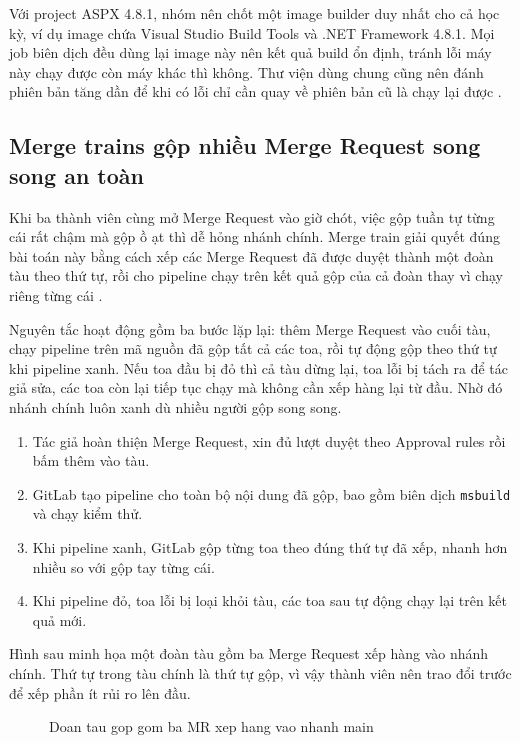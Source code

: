 Với project ASPX 4.8.1, nhóm nên chốt một image builder duy nhất cho cả học kỳ, ví dụ image chứa Visual Studio Build Tools và .NET Framework 4.8.1. Mọi job biên dịch đều dùng lại image này nên kết quả build ổn định, tránh lỗi máy này chạy được còn máy khác thì không. Thư viện dùng chung cũng nên đánh phiên bản tăng dần để khi có lỗi chỉ cần quay về phiên bản cũ là chạy lại được \cite{convcommits}.

\subsection{Merge trains gộp nhiều Merge Request song song an toàn}

Khi ba thành viên cùng mở Merge Request vào giờ chót, việc gộp tuần tự từng cái rất chậm mà gộp ồ ạt thì dễ hỏng nhánh chính. Merge train giải quyết đúng bài toán này bằng cách xếp các Merge Request đã được duyệt thành một đoàn tàu theo thứ tự, rồi cho pipeline chạy trên kết quả gộp của cả đoàn thay vì chạy riêng từng cái \cite{gitlabdocs}.

Nguyên tắc hoạt động gồm ba bước lặp lại: thêm Merge Request vào cuối tàu, chạy pipeline trên mã nguồn đã gộp tất cả các toa, rồi tự động gộp theo thứ tự khi pipeline xanh. Nếu toa đầu bị đỏ thì cả tàu dừng lại, toa lỗi bị tách ra để tác giả sửa, các toa còn lại tiếp tục chạy mà không cần xếp hàng lại từ đầu. Nhờ đó nhánh chính luôn xanh dù nhiều người gộp song song.

\begin{enumerate}
    \item Tác giả hoàn thiện Merge Request, xin đủ lượt duyệt theo Approval rules rồi bấm thêm vào tàu.
    \item GitLab tạo pipeline cho toàn bộ nội dung đã gộp, bao gồm biên dịch \verb|msbuild| và chạy kiểm thử.
    \item Khi pipeline xanh, GitLab gộp từng toa theo đúng thứ tự đã xếp, nhanh hơn nhiều so với gộp tay từng cái.
    \item Khi pipeline đỏ, toa lỗi bị loại khỏi tàu, các toa sau tự động chạy lại trên kết quả mới.
\end{enumerate}

Hình sau minh họa một đoàn tàu gồm ba Merge Request xếp hàng vào nhánh chính. Thứ tự trong tàu chính là thứ tự gộp, vì vậy thành viên nên trao đổi trước để xếp phần ít rủi ro lên đầu.

\begin{figure}[H]
\centering
{}
\caption{Doan tau gop gom ba MR xep hang vao nhanh main}
\label{fig:c53-train}
\end{figure}

